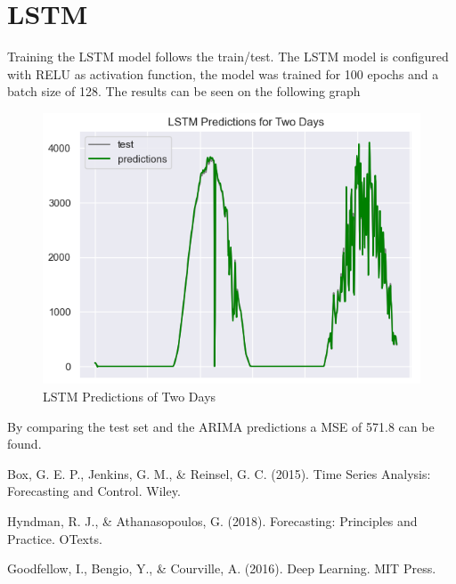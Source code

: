\documentclass[a4paper,12pt]{article}
\begin{document}
\section{LSTM}
Training the LSTM model follows the train/test. The LSTM model is configured with RELU as activation function, the model was trained for 100 epochs and a batch size of 128. The results can be seen on the following graph

\begin{figure}[H] %
    \centering %
    \includegraphics[height=0.35\textwidth]{LSTM.png} %
    \caption{LSTM Predictions of Two Days} %
    \label{fig:etiqueta_imagen} %
\end{figure} 

By comparing the test set and the ARIMA predictions a MSE of 571.8 can be found.

\begin{thebibliography}{99}
Box, G. E. P., Jenkins, G. M., \& Reinsel, G. C. (2015). Time Series Analysis: Forecasting and Control. Wiley.

Hyndman, R. J., \& Athanasopoulos, G. (2018). Forecasting: Principles and Practice. OTexts.

Goodfellow, I., Bengio, Y., \& Courville, A. (2016). Deep Learning. MIT Press.

\end{thebibliography}
\end{document}
